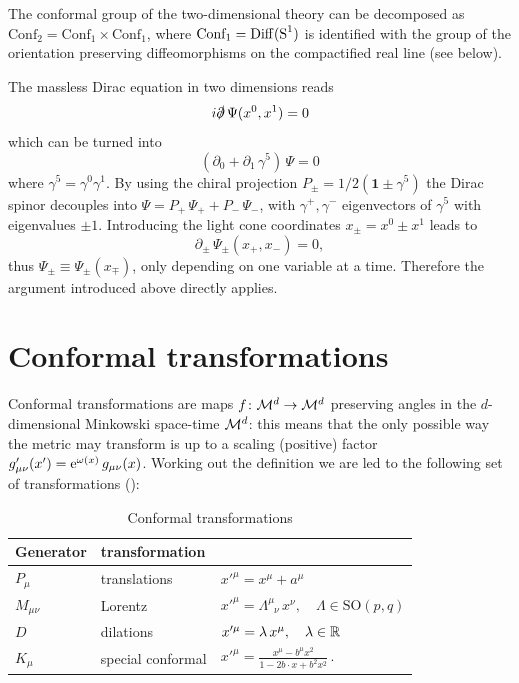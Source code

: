 The conformal group of the two-dimensional theory 
can be decomposed as $\textrm{Conf}_2=\textrm{Conf}_1\times
\textrm{Conf}_1$, where $\textrm{Conf}_1=\operatorname{Diff}(\textrm{S}^1)$ is identified
with the group of the orientation preserving diffeomorphisms 
on the compactified real line (see below).
\begin{example}
The massless Dirac equation in two dimensions reads
\[
i\slashed{\partial}\,\Psi(x^0,x^1)=0
\]
which can be turned into 
\[
(\partial_0+\partial_1\,\gamma^5)\,\Psi=0
\]
where $\gamma^5=\gamma^0\gamma^1$. By using the chiral 
projection $P_{\pm}=1/2(\bm{1}\pm\gamma^5)$ the Dirac spinor
decouples into $\Psi=P_+\,\Psi_+ + P_-\,\Psi_-$, with 
$\gamma^+,\gamma^-$ eigenvectors of $\gamma^5$ with eigenvalues 
$\pm 1$. Introducing the light cone coordinates $x_{\pm}=x^0\pm x^1$ 
leads to
\[
\partial_{\pm}\,\Psi_{\pm}(x_+,x_-)=0,
\]
thus $\Psi_{\pm}\equiv\Psi_{\pm}(x_{\mp})$, only depending 
on one variable at a time. Therefore the argument introduced
above directly applies.
\end{example}


\section{Conformal transformations}
\label{Conformal transformations}
Conformal transformations are maps $f\colon \mathcal{M}^d\to\mathcal{M}^d$
preserving angles in the $d$-dimensional Minkowski space-time 
$\mathcal{M}^d$: this means that the only possible way
the metric may transform is up to a scaling (positive) factor 
$g'_{\mu\nu}(x')=\operatorname{e}^{\omega(x)}g_{\mu\nu}(x)$. 
Working out the definition we are led to the following set of 
transformations (\cite*{KE:1998}):
\begin{table}[htbp]
\caption{Conformal transformations}
\centering
  \begin{tabular}{lll}
  \toprule
  Generator     & transformation     &    \\
  \midrule
  $P_{\mu}$     & translations       &    $x'^{\mu}=x^{\mu}+a^{\mu}$\\
  $M_{\mu \nu}$ & Lorentz            &    $x'^{\mu}=\Lambda^{\mu}_{\phantom{\mu}
                                          \nu}\,x^{\nu},\quad \Lambda\in
                                          \textrm{SO}(p,q)$\\
  $D$           & dilations          &    $x'^{\mu}=\lambda\,x^{\mu},\quad 
                                          \lambda\in\mathbb{R}$\\
  $K_{\mu}$     & special conformal  &    $x'^{\mu}=\frac{x^\mu-b^{\mu}x^2}
                                          {1-2b\cdot x+b^2 x^2}$\,.\\
  \bottomrule                                        
  \end{tabular}
\end{table}

